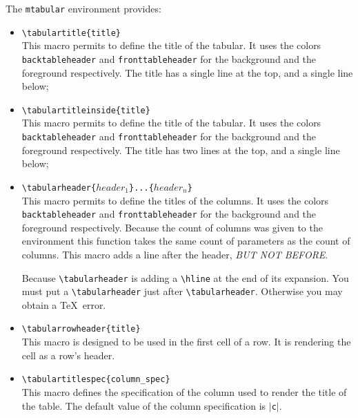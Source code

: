 \documentclass[book]{upmethodology-document}
\begin{document}
The \texttt{mtabular} environment provides:
\begin{itemize}
\item \texttt{{\textbackslash}tabulartitle\{title\}} \\
	This macro permits to define the title of the tabular. It uses the colors \texttt{backtableheader} and \texttt{fronttableheader} for the background and the foreground respectively. The title has a single line at the top, and a single line below;

\item \texttt{{\textbackslash}tabulartitleinside\{title\}} \\
	This macro permits to define the title of the tabular. It uses the colors \texttt{backtableheader} and \texttt{fronttableheader} for the background and the foreground respectively. The title has two lines at the top, and a single line below;

\item \texttt{{\textbackslash}tabularheader\{$header_1$\}...\{$header_n$\}} \\
	This macro permits to define the titles of the columns. It uses the colors \texttt{backtableheader} and \texttt{fronttableheader} for the background and the foreground respectively. Because the count of columns was given to the environment this function takes the same count of parameters as the count of columns. This macro adds a line after the header, \emph{BUT NOT BEFORE}.
\begin{upmcaution}
	Because \texttt{{\textbackslash}tabularheader} is adding a \texttt{{\textbackslash}hline} at the end of its expansion. You must put a \texttt{{\textbackslash}tabularheader} just after \texttt{{\textbackslash}tabularheader}. Otherwise you may obtain a \TeX\ error.
\end{upmcaution}

\item \texttt{{\textbackslash}tabularrowheader\{title\}} \\
	This macro is designed to be used in the first cell of a row. It is rendering the cell as a row's header.

\item \texttt{{\textbackslash}tabulartitlespec\{column\_spec\}} \\
	This macro defines the specification of the column used to render the title of the table.
	The default value of the column specification is $|$\texttt{c}$|$.

\end{itemize}
\end{document}
